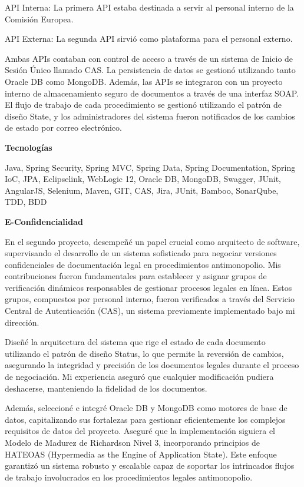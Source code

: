 \documentclass[a4paper,10pt]{article}
\newcommand{\cvsubsubsection}[1]{
\begin{tcolorbox}[colback=gray!10, colframe=gray!10, boxrule=0pt, arc=0mm, outer arc=0mm, width=\textwidth, boxsep=0pt, left=4mm, right=4mm, top=1mm, bottom=1mm]
  \textbf{#1}
\end{tcolorbox}
\vspace{1mm}
}
\newcommand{\cvsubsubsubsection}[1]{
  \begin{tcolorbox}[colback=gray!5, colframe=gray!5, boxrule=0pt, arc=0mm, outer arc=0mm, width=\textwidth, boxsep=0pt, left=6mm, right=6mm, top=1mm, bottom=1mm]
    \textbf{#1}
  \end{tcolorbox}
  \vspace{1mm}
}
\begin{document}
API Interna: La primera API estaba destinada a servir al personal interno de la Comisión Europea.

API Externa: La segunda API sirvió como plataforma para el personal externo.



Ambas APIs contaban con control de acceso a través de un sistema de Inicio de Sesión Único llamado CAS. La persistencia de datos se gestionó utilizando tanto Oracle DB como MongoDB. Además, las APIs se integraron con un proyecto interno de almacenamiento seguro de documentos a través de una interfaz SOAP. El flujo de trabajo de cada procedimiento se gestionó utilizando el patrón de diseño State, y los administradores del sistema fueron notificados de los cambios de estado por correo electrónico.

\cvsubsubsubsection{Tecnologías}
Java, Spring Security, Spring MVC, Spring Data, Spring Documentation, Spring IoC, JPA, Eclipselink, WebLogic 12, Oracle DB, MongoDB, Swagger, JUnit, AngularJS, Selenium, Maven, GIT, CAS, Jira, JUnit, Bamboo, SonarQube, TDD, BDD

\cvsubsubsection{E-Confidencialidad}
En el segundo proyecto, desempeñé un papel crucial como arquitecto de software, supervisando el desarrollo de un sistema sofisticado para negociar versiones confidenciales de documentación legal en procedimientos antimonopolio. Mis contribuciones fueron fundamentales para establecer y asignar grupos de verificación dinámicos responsables de gestionar procesos legales en línea. Estos grupos, compuestos por personal interno, fueron verificados a través del Servicio Central de Autenticación (CAS), un sistema previamente implementado bajo mi dirección.

Diseñé la arquitectura del sistema que rige el estado de cada documento utilizando el patrón de diseño Status, lo que permite la reversión de cambios, asegurando la integridad y precisión de los documentos legales durante el proceso de negociación. Mi experiencia aseguró que cualquier modificación pudiera deshacerse, manteniendo la fidelidad de los documentos.

Además, seleccioné e integré Oracle DB y MongoDB como motores de base de datos, capitalizando sus fortalezas para gestionar eficientemente los complejos requisitos de datos del proyecto. Aseguré que la implementación siguiera el Modelo de Madurez de Richardson Nivel 3, incorporando principios de HATEOAS (Hypermedia as the Engine of Application State). Este enfoque garantizó un sistema robusto y escalable capaz de soportar los intrincados flujos de trabajo involucrados en los procedimientos legales antimonopolio.
\end{document}
